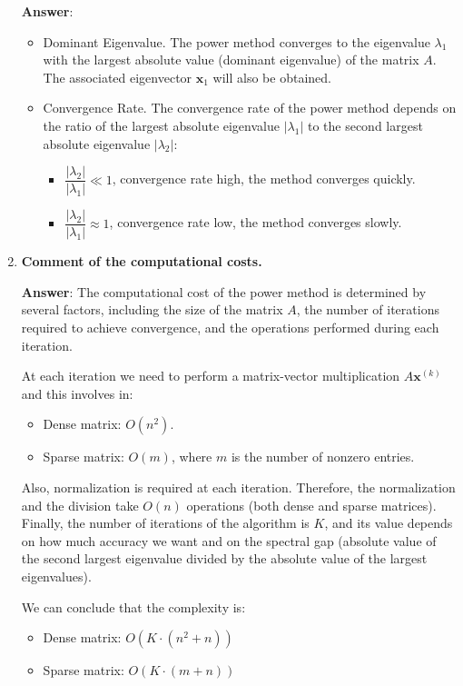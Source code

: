 \begin{enumerate}[label=\textcolor{Green3}{\textbf{\arabic*.}}]
    \textbf{Answer}:
    \begin{itemize}
        \item Dominant Eigenvalue. The power method converges to the eigenvalue $\lambda_{1}$ with the largest absolute value (dominant eigenvalue) of the matrix $A$. The associated eigenvector $\mathbf{x}_{1}$ will also be obtained.
        \item Convergence Rate. The convergence rate of the power method depends on the ratio of the largest absolute eigenvalue $\left|\lambda_{1}\right|$ to the second largest absolute eigenvalue $\left|\lambda_{2}\right|$:
        \begin{itemize}
            \item $\dfrac{\left|\lambda_{2}\right|}{\left|\lambda_{1}\right|} \ll 1$, convergence rate high, the method converges quickly.
            \item $\dfrac{\left|\lambda_{2}\right|}{\left|\lambda_{1}\right|} \approx 1$, convergence rate low, the method converges slowly.
        \end{itemize}
    \end{itemize}




    \item \textcolor{Green3}{\textbf{%
        Comment of the computational costs.
    }}

    \textbf{Answer}: The computational cost of the power method is determined by several factors, including the size of the matrix \( A \), the number of iterations required to achieve convergence, and the operations performed during each iteration.

    At each iteration we need to perform a matrix-vector multiplication $A \mathbf{x}^{(k)}$ and this involves in:
    \begin{itemize}
        \item Dense matrix: $O\left(n^{2}\right)$.
        \item Sparse matrix: $O\left(m\right)$, where $m$ is the number of nonzero entries.
    \end{itemize}
    Also, normalization is required at each iteration. Therefore, the normalization and the division take $O\left(n\right)$ operations (both dense and sparse matrices). Finally, the number of iterations of the algorithm is $K$, and its value depends on how much accuracy we want and on the spectral gap (absolute value of the second largest eigenvalue divided by the absolute value of the largest eigenvalues).

    We can conclude that the complexity is:
    \begin{itemize}
        \item Dense matrix: $O\left(K \cdot \left(n^{2} + n\right)\right)$
        \item Sparse matrix: $O\left(K \cdot \left(m + n\right)\right)$
    \end{itemize}
\end{enumerate}


